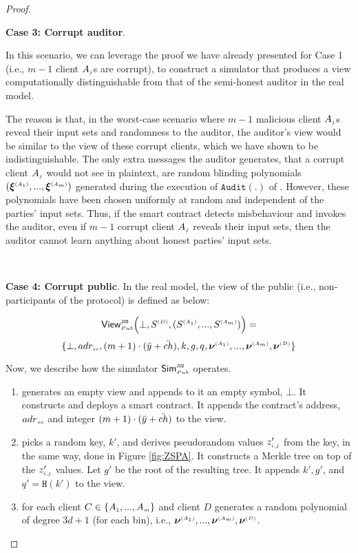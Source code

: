 \begin{proof}
 
 \

\noindent\textbf{Case 3: Corrupt auditor}. 

In this scenario, we can leverage the proof we have already presented for Case 1 (i.e.,  $m-1$ client $A_{\scriptscriptstyle j}$s are corrupt), to construct a simulator that produces a view computationally distinguishable from that of the semi-honest auditor in the real model. 

 The reason is that, in the worst-case scenario where $m-1$ malicious client $A_{\scriptscriptstyle j}$s reveal their input sets and randomness to the auditor, the auditor's view would be similar to the view of these corrupt clients, which we have shown to be indistinguishable. The only extra messages the auditor generates, that a corrupt client $A_{\scriptscriptstyle j}$ would not see in plaintext, are random blinding polynomials $(\bm\xi^{\scriptscriptstyle (A_1)},..., \bm\xi^{\scriptscriptstyle (A_m)})$ generated during the execution of $\mathtt{Audit}(.)$ of \zspaa. However, these polynomials have been chosen uniformly at random and independent of the parties' input sets. Thus, if the smart contract detects misbehaviour and invokes the auditor, even if $m-1$ corrupt client $A_{\scriptscriptstyle j}$ reveals their input sets, then the auditor cannot learn anything about honest parties' input sets.    
 
 \

\noindent\textbf{Case 4: Corrupt public}. In the real model, the view of the public (i.e., non-participants of the protocol) is defined as below: 
 

 $$ \mathsf{View}_{\scriptscriptstyle Pub}^{\scriptscriptstyle \mathtt{JUS}} \Big(\bot, S^{\scriptscriptstyle (D)},(S^{\scriptscriptstyle (A_1)},..., S^{\scriptscriptstyle (A_m)})\Big)=$$ $$ \{\bot, adr_{\scriptscriptstyle sc}, (m+1)\cdot(\ddot{y}+\ddot{ch}), k, g, q, \bm\nu^{\scriptscriptstyle (A_1)},..., \bm\nu^{\scriptscriptstyle (A_m)}, \bm\nu^{\scriptscriptstyle (D)}\}$$
 
 
 Now, we describe how the simulator $\mathsf{Sim}^{\scriptscriptstyle \mathtt{JUS}}_{\scriptscriptstyle Pub}$  operates. 
 
 \begin{enumerate}
 \item generates an empty view and appends to it an empty symbol, $\bot$. It constructs and deploys a smart contract. It appends the contract's address, $  {adr}_{\scriptscriptstyle sc}$ and integer $(m+1)\cdot(\ddot{y}+\ddot{ch})$ to the view.
\item picks a random key, $  k'$, and derives pseudorandom values $z'_{\scriptscriptstyle i,j}$ from the key,  in the same way, done in Figure \ref{fig:ZSPA}. It constructs a Merkle tree on top of the $z'_{\scriptscriptstyle i, j}$ values. Let $g'$ be the root of the resulting tree. It appends $  k', g'$, and $q' = \mathtt{H}(  k')$ to the view. 
%
\item for each client $C\in \{  {  A}_{ \scriptscriptstyle {   1}}, ...,   {  A}_{ \scriptscriptstyle {   m}}\}$ and client $D$ generates a random polynomial of degree $3d+1$ (for each bin), i.e.,  $ {\bm\nu}^{\scriptscriptstyle (A_1)}, ...,  {\bm\nu}^{\scriptscriptstyle (A_m)},  {\bm\nu}^{\scriptscriptstyle (D)}$. 
 \end{enumerate}
 

\end{proof}
